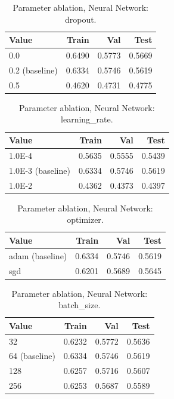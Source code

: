 \begin{table}[ht]
\centering
\small
\caption{Parameter ablation, Neural Network: dropout.}
\label{tab:ablation-neural-dropout}
\begin{tabular}{lrrr}
\toprule
Value & Train & Val & Test \\
\midrule
0.0 & 0.6490 & 0.5773 & 0.5669 \\
0.2 (baseline) & 0.6334 & 0.5746 & 0.5619 \\
0.5 & 0.4620 & 0.4731 & 0.4775 \\
\bottomrule
\end{tabular}
\end{table}

\begin{table}[ht]
\centering
\small
\caption{Parameter ablation, Neural Network: learning\_rate.}
\label{tab:ablation-neural-learning-rate}
\begin{tabular}{lrrr}
\toprule
Value & Train & Val & Test \\
\midrule
1.0E-4 & 0.5635 & 0.5555 & 0.5439 \\
1.0E-3 (baseline) & 0.6334 & 0.5746 & 0.5619 \\
1.0E-2 & 0.4362 & 0.4373 & 0.4397 \\
\bottomrule
\end{tabular}
\end{table}

\begin{table}[ht]
\centering
\small
\caption{Parameter ablation, Neural Network: optimizer.}
\label{tab:ablation-neural-optimizer}
\begin{tabular}{lrrr}
\toprule
Value & Train & Val & Test \\
\midrule
adam (baseline) & 0.6334 & 0.5746 & 0.5619 \\
sgd & 0.6201 & 0.5689 & 0.5645 \\
\bottomrule
\end{tabular}
\end{table}

\begin{table}[ht]
\centering
\small
\caption{Parameter ablation, Neural Network: batch\_size.}
\label{tab:ablation-neural-batch-size}
\begin{tabular}{lrrr}
\toprule
Value & Train & Val & Test \\
\midrule
32 & 0.6232 & 0.5772 & 0.5636 \\
64 (baseline) & 0.6334 & 0.5746 & 0.5619 \\
128 & 0.6257 & 0.5716 & 0.5607 \\
256 & 0.6253 & 0.5687 & 0.5589 \\
\bottomrule
\end{tabular}
\end{table}

